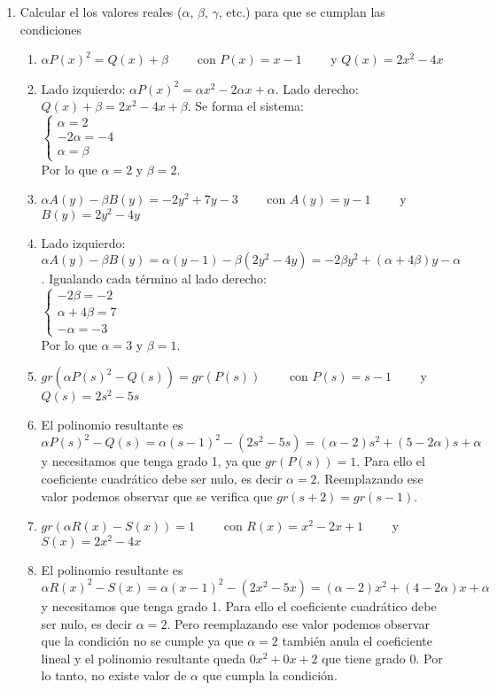 \documentclass[a4paper]{article}
\newcommand{\answer}{\item[**]}
\newcommand{\exercise}{\item}
\newcommand{\SEL}[1]{\left\{\begin{matrix} #1 \end{matrix}\right.}
\newcommand{\df}[2]{\displaystyle\frac{#1}{#2}}
\begin{document}
\begin{enumerate}
\begin{enumerate} [label=(\alph*)]
		\item $\df{8z^4-4}{-2z^2+z+3}$
		\answer $\df{8z^4-4}{-2z^2+z+3}=(-4x^2-2x-7)+\df{13z+17}{-2z^2+z+3}$. \href{https://youtu.be/0Dw3MAwrA34}{Resolución}

		\item $\df{x^2+3}{x-i}$
		\answer $\df{x^2+3}{x-i}=(x+i)+\df{2}{x-i}$

	\end{enumerate}

	\exercise Calcular el los valores reales ($\alpha$, $\beta$, $\gamma$, etc.) para que se cumplan las condiciones
	\begin{enumerate} [label=(\alph*)]
		
		\item $\alpha P(x)^2 = Q(x) +\beta$ ~~~~con $P(x)=x-1$ ~~~~y $Q(x)=2x^2-4x$
		\answer Lado izquierdo: $\alpha P(x)^2= \alpha x^2-2 \alpha x+ \alpha$. Lado derecho: $Q(x) +\beta= 2x^2-4x+\beta$. Se forma el sistema: \\ $\SEL{\alpha=2 \\ -2\alpha = -4 \\ \alpha= \beta}$ \\ Por lo que $\alpha=2$ y $\beta=2$.

		\item $\alpha A(y)-\beta B(y) = -2y^2 +7y-3$ ~~~~con $A(y)=y-1$ ~~~~y $B(y)=2y^2-4y$
		\answer Lado izquierdo: $\alpha A(y)-\beta B(y) = \alpha (y-1)- \beta (2y^2-4y)= -2\beta y^2 + (\alpha+4\beta) y - \alpha$. Igualando cada término al lado derecho: \\  $\SEL{-2\beta =-2 \\ \alpha+4\beta=7 \\ -\alpha=-3}$ \\ Por lo que $\alpha=3$ y $\beta=1$.

		\item $gr\left(\alpha P(s)^2 - Q(s)\right)=gr\left(P(s)\right)$ ~~~~con $P(s)=s-1$ ~~~~y $Q(s)=2s^2-5s$
		\answer El polinomio resultante es $\alpha P(s)^2 - Q(s)= \alpha (s-1)^2 - (2s^2-5s)= (\alpha-2) s^2 + (5-2\alpha) s + \alpha$ y necesitamos que tenga grado 1, ya que $gr\left(P(s)\right)=1$. Para ello el coeficiente cuadrático debe ser nulo, es decir $\alpha=2$. Reemplazando ese valor podemos observar que se verifica que $gr(s+2)=gr(s-1)$.

		\item $gr\left(\alpha R(x) - S(x)\right)=1$ ~~~~con $R(x)=x^2-2x+1$ ~~~~y $S(x)=2x^2-4x$
		\answer El polinomio resultante es $\alpha R(x)^2 - S(x)= \alpha (x-1)^2 - (2x^2-5x)= (\alpha-2) x^2 + (4-2\alpha) x + \alpha$ y necesitamos que tenga grado 1. Para ello el coeficiente cuadrático debe ser nulo, es decir $\alpha=2$. Pero reemplazando ese valor podemos observar que la condición no se cumple ya que $\alpha=2$ también anula el coeficiente lineal y el polinomio resultante queda $0x^2+0x+2$ que tiene grado $0$. Por lo tanto, no existe valor de $\alpha$ que cumpla la condición.


\end{enumerate}
\end{enumerate}
\end{document}
